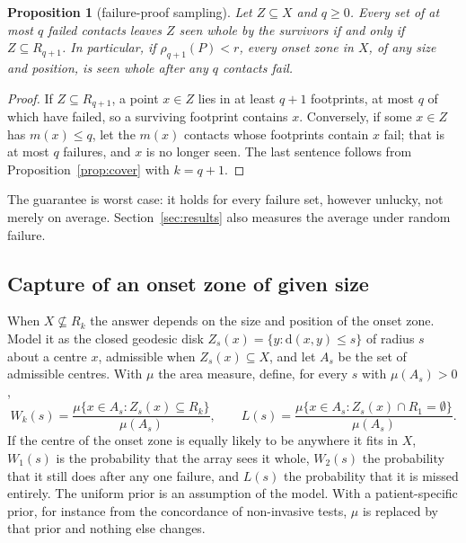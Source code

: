 \documentclass[11pt]{amsart}
\newtheorem{proposition}[theorem]{Proposition}
\theoremstyle{definition}
\theoremstyle{remark}
\newcommand{\dd}{\mathrm{d}}
\begin{document}
\begin{proposition}[failure-proof sampling]\label{prop:failure}
Let $Z\subseteq X$ and $q\ge0$. Every set of at most $q$ failed contacts leaves
$Z$ seen whole by the survivors if and only if $Z\subseteq R_{q+1}$. In
particular, if $\rho_{q+1}(P)<r$, every onset zone in $X$, of any size and
position, is seen whole after any $q$ contacts fail.
\end{proposition}

\begin{proof}
If $Z\subseteq R_{q+1}$, a point $x\in Z$ lies in at least $q+1$ footprints,
at most $q$ of which have failed, so a surviving footprint contains $x$.
Conversely, if some $x\in Z$ has $m(x)\le q$, let the $m(x)$ contacts whose
footprints contain $x$ fail; that is at most $q$ failures, and $x$ is no longer
seen. The last sentence follows from Proposition~\ref{prop:cover} with
$k=q+1$.
\end{proof}

The guarantee is worst case: it holds for every failure set, however
unlucky, not merely on average. Section~\ref{sec:results} also measures the
average under random failure.

\subsection*{Capture of an onset zone of given size}
When $X\not\subseteq R_k$ the answer depends on the size and position of the
onset zone. Model it as the closed geodesic disk
$Z_s(x)=\{y:\dd(x,y)\le s\}$ of radius $s$ about a centre $x$, admissible when
$Z_s(x)\subseteq X$, and let $A_s$ be the set of admissible centres. With
$\mu$ the area measure, define, for every $s$ with $\mu(A_s)>0$,
\[
W_k(s)=\frac{\mu\{x\in A_s:Z_s(x)\subseteq R_k\}}{\mu(A_s)},\qquad
L(s)=\frac{\mu\{x\in A_s:Z_s(x)\cap R_1=\emptyset\}}{\mu(A_s)}.
\]
If the centre of the onset zone is equally likely to be anywhere it fits in
$X$, $W_1(s)$ is the probability that the array sees it whole, $W_2(s)$ the
probability that it still does after any one failure, and $L(s)$ the
probability that it is missed entirely. The uniform prior is an assumption of
the model. With a patient-specific prior, for instance from the concordance of
non-invasive tests, $\mu$ is replaced by that prior and nothing else changes.
\end{document}
